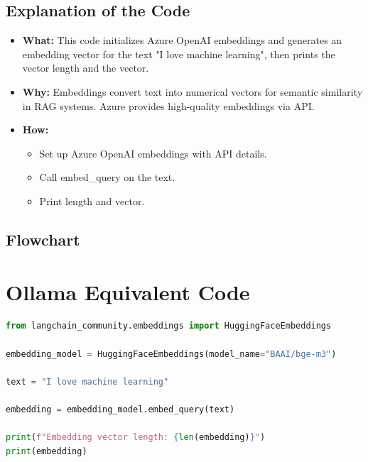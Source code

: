 \documentclass[11pt, a4paper]{article}
\begin{document}
\subsection{Explanation of the Code}
\begin{itemize}
    \item \textbf{What:} This code initializes Azure OpenAI embeddings and generates an embedding vector for the text "I love machine learning", then prints the vector length and the vector.
    \item \textbf{Why:} Embeddings convert text into numerical vectors for semantic similarity in RAG systems. Azure provides high-quality embeddings via API.
    \item \textbf{How:}
    \begin{itemize}
        \item Set up Azure OpenAI embeddings with API details.
        \item Call embed\_query on the text.
        \item Print length and vector.
    \end{itemize}
\end{itemize}

\subsection{Flowchart}

\section{Ollama Equivalent Code}
\begin{lstlisting}[language=Python]
from langchain_community.embeddings import HuggingFaceEmbeddings

embedding_model = HuggingFaceEmbeddings(model_name="BAAI/bge-m3")

text = "I love machine learning"

embedding = embedding_model.embed_query(text)

print(f"Embedding vector length: {len(embedding)}")
print(embedding)
\end{lstlisting}
\end{document}
